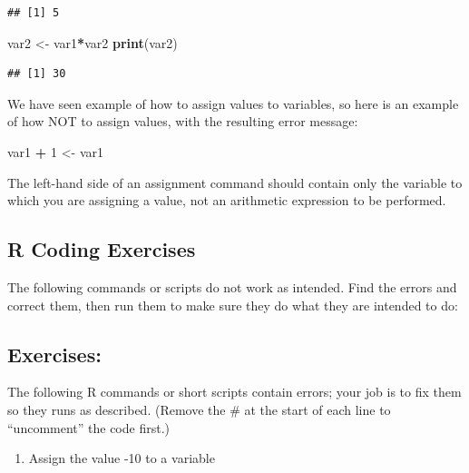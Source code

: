 \documentclass[
]{book}
\newenvironment{Shaded}{\begin{snugshade}}{\end{snugshade}}
\newcommand{\DecValTok}[1]{\textcolor[rgb]{0.00,0.00,0.81}{#1}}
\newcommand{\KeywordTok}[1]{\textcolor[rgb]{0.13,0.29,0.53}{\textbf{#1}}}
\newcommand{\NormalTok}[1]{#1}
\newcommand{\OperatorTok}[1]{\textcolor[rgb]{0.81,0.36,0.00}{\textbf{#1}}}
\newcommand{\StringTok}[1]{\textcolor[rgb]{0.31,0.60,0.02}{#1}}
\providecommand{\tightlist}{%
  \setlength{\itemsep}{0pt}\setlength{\parskip}{0pt}}
\begin{document}
\begin{verbatim}
## [1] 5
\end{verbatim}

\begin{Shaded}
\begin{Highlighting}[]
\NormalTok{var2 \textless{}{-}}\StringTok{ }\NormalTok{var1}\OperatorTok{*}\NormalTok{var2}
\KeywordTok{print}\NormalTok{(var2)}
\end{Highlighting}
\end{Shaded}

\begin{verbatim}
## [1] 30
\end{verbatim}

We have seen example of how to assign values to variables, so here is an example of how NOT to assign values, with the resulting error message:

\begin{Shaded}
\begin{Highlighting}[]
\NormalTok{var1 }\OperatorTok{+}\StringTok{ }\DecValTok{1}\NormalTok{ \textless{}{-}}\StringTok{ }\NormalTok{var1}
\end{Highlighting}
\end{Shaded}

The left-hand side of an assignment command should contain only the variable to which you are assigning a value, not an arithmetic expression to be performed.

\hypertarget{r-coding-exercises-1}{%
\subsection{R Coding Exercises}\label{r-coding-exercises-1}}

The following commands or scripts do not work as intended. Find the errors and correct them, then run them to make sure they do what they are intended to do:

\hypertarget{exercises}{%
\subsection{Exercises:}\label{exercises}}

The following R commands or short scripts contain errors; your job is to fix them so they runs as described. (Remove the \# at the start of each line to ``uncomment'' the code first.)

\begin{enumerate}
\def\labelenumi{\arabic{enumi}.}
\tightlist
\item
  Assign the value -10 to a variable
\end{enumerate}
\end{document}
